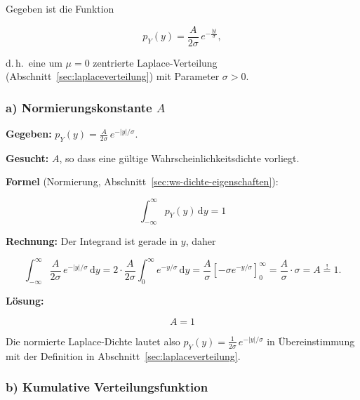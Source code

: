 Gegeben ist die Funktion

$$
p_Y(y) = \frac{A}{2\sigma}\, e^{-\frac{|y|}{\sigma}},
$$

d.\,h.\ eine um $\mu = 0$ zentrierte Laplace-Verteilung
(Abschnitt~\ref{sec:laplaceverteilung}) mit Parameter $\sigma > 0$.

\subsubsection*{a) Normierungskonstante $A$}

\begin{beispiel}

\textbf{Gegeben:} $p_Y(y) = \tfrac{A}{2\sigma}\, e^{-|y|/\sigma}$.

\textbf{Gesucht:} $A$, so dass eine gültige Wahrscheinlichkeitsdichte vorliegt.

\textbf{Formel} (Normierung, Abschnitt~\ref{sec:ws-dichte-eigenschaften}):

$$
\int_{-\infty}^{\infty} p_Y(y)\,\mathrm{d}y = 1
$$

\textbf{Rechnung:} Der Integrand ist gerade in $y$, daher

$$
\int_{-\infty}^{\infty} \frac{A}{2\sigma}\, e^{-|y|/\sigma}\,\mathrm{d}y
= 2 \cdot \frac{A}{2\sigma} \int_0^{\infty} e^{-y/\sigma}\,\mathrm{d}y
= \frac{A}{\sigma} \left[-\sigma e^{-y/\sigma}\right]_0^{\infty}
= \frac{A}{\sigma} \cdot \sigma = A \overset{!}{=} 1.
$$

\textbf{Lösung:}

$$
\boxed{\;A = 1\;}
$$

Die normierte Laplace-Dichte lautet also
$p_Y(y) = \tfrac{1}{2\sigma}\, e^{-|y|/\sigma}$ in Übereinstimmung mit der
Definition in Abschnitt~\ref{sec:laplaceverteilung}.

\end{beispiel}

\subsubsection*{b) Kumulative Verteilungsfunktion}


